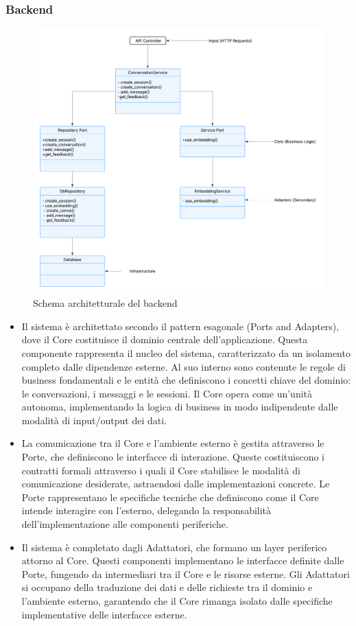 \subsubsection{Backend}
    \begin{figure}[H]
    \centering
    \includegraphics[width=\textwidth]{images/architettura.png}
    \caption{Schema architetturale del backend}
    \label{fig:architettura}
\end{figure}
\begin{itemize}
\item Il sistema è architettato secondo il pattern esagonale (Ports and Adapters), dove il Core costituisce il dominio centrale dell'applicazione. Questa componente rappresenta il nucleo del sistema, caratterizzato da un isolamento completo dalle dipendenze esterne. Al suo interno sono contenute le regole di business fondamentali e le entità che definiscono i concetti chiave del dominio: le conversazioni, i messaggi e le sessioni. Il Core opera come un'unità autonoma, implementando la logica di business in modo indipendente dalle modalità di input/output dei dati.
\item La comunicazione tra il Core e l'ambiente esterno è gestita attraverso le Porte, che definiscono le interfacce di interazione. Queste costituiscono i contratti formali attraverso i quali il Core stabilisce le modalità di comunicazione desiderate, astraendosi dalle implementazioni concrete. Le Porte rappresentano le specifiche tecniche che definiscono come il Core intende interagire con l'esterno, delegando la responsabilità dell'implementazione alle componenti periferiche.
\item Il sistema è completato dagli Adattatori, che formano un layer periferico attorno al Core. Questi componenti implementano le interfacce definite dalle Porte, fungendo da intermediari tra il Core e le risorse esterne. Gli Adattatori si occupano della traduzione dei dati e delle richieste tra il dominio e l'ambiente esterno, garantendo che il Core rimanga isolato dalle specifiche implementative delle interfacce esterne.
\end{itemize}
